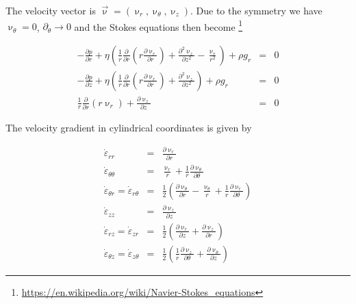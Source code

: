 The velocity vector is $\vec{\upnu}=(\upnu_r,\upnu_\theta,\upnu_z)$. 
Due to the symmetry we have $\upnu_\theta=0$, $\partial_\theta \rightarrow 0$ 
and the Stokes equations 
then become \footnote{\url{https://en.wikipedia.org/wiki/Navier-Stokes_equations}}

\begin{eqnarray}
-\frac{\partial p}{\partial r} + \eta
\left(
\frac1r \frac{\partial}{\partial r} ( r  \frac{\partial \upnu_r}{\partial r}   ) 
+  \frac{\partial^2 \upnu_z}{\partial z^2} - \frac{\upnu_r}{r^2}
\right) +\rho g_r&=& 0 \\
-\frac{\partial p}{\partial z} + \eta
\left(
\frac1r \frac{\partial}{\partial r} ( r  \frac{\partial \upnu_r}{\partial r}   ) 
+  \frac{\partial^2 \upnu_z}{\partial z^2} 
\right) +\rho g_r&=& 0 \\
\frac1r \frac{\partial}{\partial r} (r \upnu_r) + \frac{\partial \upnu_z}{\partial z} &=& 0
\end{eqnarray}


The velocity gradient in cylindrical coordinates is given by 

\begin{eqnarray}
\dot\varepsilon_{rr} 
&=& \frac{\partial \upnu_r}{\partial r} 
\\
\dot\varepsilon_{\theta\theta} 
&=& \frac{\upnu_r}{r} + \frac{1}{r} \frac{\partial \upnu_\theta}{\partial \theta}  
\\
\dot\varepsilon_{\theta r} = \dot\varepsilon_{r\theta} 
&=& \frac{1}{2} \left(   \frac{\partial \upnu_\theta}{\partial r} - \frac{\upnu_\theta}{r} 
+\frac{1}{r} \frac{\partial \upnu_r}{\partial \theta}  \right)
\\
\dot\varepsilon_{zz} 
&=& \frac{\partial \upnu_z}{\partial z} 
\\
\dot{\varepsilon}_{rz} = \dot{\varepsilon}_{zr} 
&=& \frac{1}{2}\left( \frac{\partial \upnu_r}{\partial z} + \frac{\partial \upnu_z}{\partial r}  \right) 
\\
\dot{\varepsilon}_{\theta z} = \dot{\varepsilon}_{z \theta} &=& \frac{1}{2}\left( 
\frac{1}{r} \frac{\partial \upnu_z}{\partial \theta} + \frac{\partial \upnu_\theta}{\partial z}  \right) 
\end{eqnarray}

